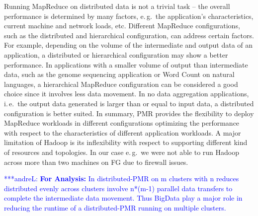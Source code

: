 \documentclass{acm_proc_article-sp}
\newcommand{\alnote}[1]{ {\textcolor{blue} { ***andreL: #1 }}}
\newcommand{\note}[1]{ {\textcolor{red} { ***Note: #1 }}}
\newcommand{\alnote}[1]{}
\newcommand{\note}[1]{}
\begin{document}





Running MapReduce on distributed data is not a trivial task -- the overall
performance is determined by many factors, e.\,g.\ the application's
characteristics, current machine and network loads, etc. Different MapReduce
configurations, such as the distributed and hierarchical configuration, can
address certain factors. For example, depending on the volume of the
intermediate and output data of an application, a distributed or hierarchical
configuration may show a better performance. In applications with a smaller
volume of output than intermediate data, such as the genome sequencing
application or Word Count on natural languages, a hierarchical MapReduce
configuration can be considered a good choice since it involves less data
movement. In no data aggregation applications, i.\,e.\ the output data generated
is larger than or equal to input data, a distributed configuration is better
suited. In summary, PMR provides the flexibility to deploy MapReduce workloads
in different configurations optimizing the performance with respect to the
characteristics of different application workloads. A major limitation of Hadoop
is its inflexibility with respect to supporting different kind of resources and
topologies. In our case e.\,g.\ we were not able to run Hadoop across more than
two machines on FG due to firewall issues.







\alnote{\textbf{For Analysis:}
In distributed-PMR on m clusters
with n reduces distributed evenly across clusters involve n*(m-1) parallel data
transfers to complete the intermediate data movement. Thus BigData play a major
role in reducing the runtime of a distributed-PMR running on multiple clusters.
}
\end{document}
